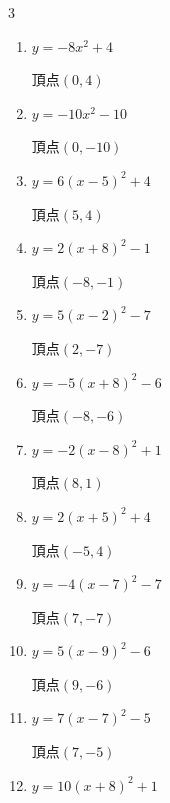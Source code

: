 \begin{multicols}{3}
\begin{enumerate}
  \item $\displaystyle y=-8x^{2}+4$

        $\displaystyle 頂点\left( 0 , 4 \right)$

  \item $\displaystyle y=-10x^{2}-10$

        $\displaystyle 頂点\left( 0 , -10 \right)$

  \item $\displaystyle y=6\left( x-5\right)^{2}+4$

        $\displaystyle 頂点\left( 5 , 4 \right)$

  \item $\displaystyle y=2\left( x+8\right)^{2}-1$

        $\displaystyle 頂点\left( -8 , -1 \right)$

  \item $\displaystyle y=5\left( x-2\right)^{2}-7$

        $\displaystyle 頂点\left( 2 , -7 \right)$

  \item $\displaystyle y=-5\left( x+8\right)^{2}-6$

        $\displaystyle 頂点\left( -8 , -6 \right)$

\columnbreak %

  \item $\displaystyle y=-2\left( x-8\right)^{2}+1$

        $\displaystyle 頂点\left( 8 , 1 \right)$

  \item $\displaystyle y=2\left( x+5\right)^{2}+4$

        $\displaystyle 頂点\left( -5 , 4 \right)$

  \item $\displaystyle y=-4\left( x-7\right)^{2}-7$

        $\displaystyle 頂点\left( 7 , -7 \right)$

  \item $\displaystyle y=5\left( x-9\right)^{2}-6$

        $\displaystyle 頂点\left( 9 , -6 \right)$

  \item $\displaystyle y=7\left( x-7\right)^{2}-5$

        $\displaystyle 頂点\left( 7 , -5 \right)$

  \item $\displaystyle y=10\left( x+8\right)^{2}+1$


\end{enumerate}
\end{multicols}
